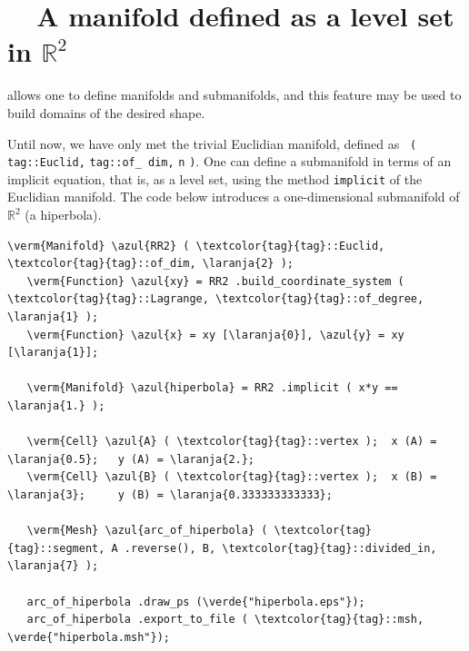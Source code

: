 \section{~~A manifold defined as a level set in $ \mathbb{R}^2 $}
\label{\numb section 2.\numb parag 4}

{\ManiFEM} allows one to define manifolds and submanifolds, and this feature may be
used to build domains of the desired shape.

Until now, we have only met the trivial Euclidian manifold, defined as {\small\tt
{}\break ( \textcolor{tag}{tag}::Euclid,} {\small\tt\textcolor{tag}{tag}::of\_\,dim,}
{\small\tt n} {\small\tt )}.
One can define a submanifold in terms of an implicit equation, that is, as a level set,
using the method {\small\tt implicit} of the Euclidian manifold.
The code below introduces a one-dimensional submanifold of $ \mathbb{R}^2 $ (a hiperbola).

\begin{Verbatim}[commandchars=\\\{\},formatcom=\small\tt,frame=single,
   label=parag-\ref{\numb section 2.\numb parag 4}.cpp,rulecolor=\color{coment},
   baselinestretch=0.94,framesep=2mm]
   \verm{Manifold} \azul{RR2} ( \textcolor{tag}{tag}::Euclid, \textcolor{tag}{tag}::of_dim, \laranja{2} );
   \verm{Function} \azul{xy} = RR2 .build_coordinate_system ( \textcolor{tag}{tag}::Lagrange, \textcolor{tag}{tag}::of_degree, \laranja{1} );
   \verm{Function} \azul{x} = xy [\laranja{0}], \azul{y} = xy [\laranja{1}];
   
   \verm{Manifold} \azul{hiperbola} = RR2 .implicit ( x*y == \laranja{1.} );
   
   \verm{Cell} \azul{A} ( \textcolor{tag}{tag}::vertex );  x (A) = \laranja{0.5};   y (A) = \laranja{2.};
   \verm{Cell} \azul{B} ( \textcolor{tag}{tag}::vertex );  x (B) = \laranja{3};     y (B) = \laranja{0.333333333333};

   \verm{Mesh} \azul{arc_of_hiperbola} ( \textcolor{tag}{tag}::segment, A .reverse(), B, \textcolor{tag}{tag}::divided_in, \laranja{7} );

   arc_of_hiperbola .draw_ps (\verde{"hiperbola.eps"});
   arc_of_hiperbola .export_to_file ( \textcolor{tag}{tag}::msh, \verde{"hiperbola.msh"});
\end{Verbatim}

